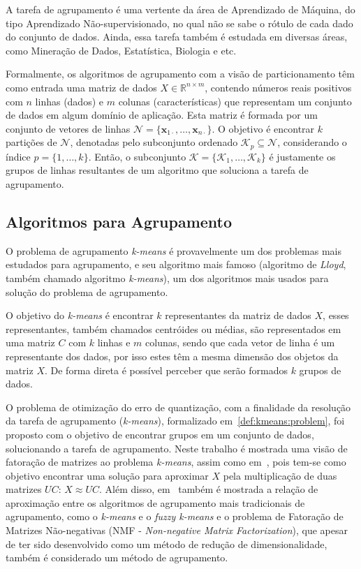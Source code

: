\documentclass[
    12pt,                %
    oneside,            %
    a4paper,            %
    english,            %
    brazil                %
    ]{abntex2ppgsi}
\begin{document}
A tarefa de agrupamento é uma vertente da área de Aprendizado de Máquina, do tipo Aprendizado Não-supervisionado, no qual não se sabe o rótulo de cada dado do conjunto de dados.
Ainda, essa tarefa também é estudada em diversas áreas, como Mineração de Dados, Estatística, Biologia e etc.

Formalmente, os algoritmos de agrupamento com a visão de particionamento têm como entrada uma matriz de dados $X \in \mathbb{R}^{n \times m}$, contendo números reais positivos com $n$ linhas (dados) e $m$ colunas (características) que representam um conjunto de dados em algum domínio de aplicação.
Esta matriz é formada por um conjunto de vetores de linhas $\mathcal{N} = \{ \mathbf{x}_{1 \cdot}, \dots, \mathbf{x}_{n \cdot} \}$.
O objetivo é encontrar $k$ partições de $\mathcal{N}$, denotadas pelo subconjunto ordenado $\mathcal{K}_p \subseteq \mathcal{N}$, considerando o índice $p = \{ 1, \dots, k\}$.
Então, o subconjunto $\mathscr{K} = \{\mathcal{K}_1, \dots, \mathcal{K}_k\}$ é justamente os grupos de linhas resultantes de um algoritmo que soluciona a tarefa de agrupamento.

\subsection{Algoritmos para Agrupamento}
\label{sec:clustering:algos}

O problema de agrupamento \textit{k-means} é provavelmente um dos problemas mais estudados para agrupamento, e seu algoritmo mais famoso (algoritmo de \textit{Lloyd}, também chamado algoritmo \textit{k-means}), um dos algoritmos mais usados para solução do problema de agrupamento.

O objetivo do \textit{k-means} é encontrar $k$ representantes da matriz de dados $X$, esses representantes, também chamados centróides ou médias, são representados em uma matriz $C$ com $k$ linhas e $m$ colunas, sendo que cada vetor de linha é um representante dos dados, por isso estes têm a mesma dimensão dos objetos da matriz $X$.
De forma direta é possível perceber que serão formados $k$ grupos de dados.

O problema de otimização do erro de quantização, com a finalidade da resolução da tarefa de agrupamento (\textit{k-means}), formalizado em~\ref{def:kmeans:problem}, foi proposto com o objetivo de encontrar grupos em um conjunto de dados, solucionando a tarefa de agrupamento.
Neste trabalho é mostrada uma visão de fatoração de matrizes ao problema \textit{k-means}, assim como em~, pois tem-se como objetivo encontrar uma solução para aproximar $X$ pela multiplicação de duas matrizes $UC$: $X \approx UC$.
Além disso, em~ também é mostrada a relação de aproximação entre os algoritmos de agrupamento mais tradicionais de agrupamento, como o \textit{k-means} e o \textit{fuzzy k-means} e o problema de Fatoração de Matrizes Não-negativas (NMF - \textit{Non-negative Matrix Factorization}), que apesar de ter sido desenvolvido como um método de redução de dimensionalidade, também é considerado um método de agrupamento.
\end{document}
